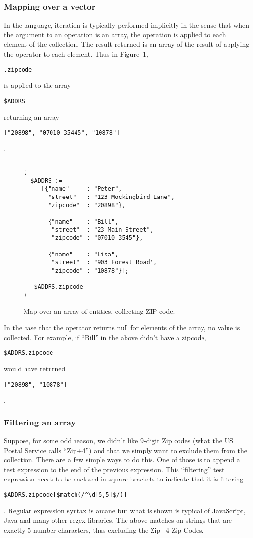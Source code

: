 \documentclass[9pt,letterpaper]{article}
\newcommand{\stt}[1]{\begin{footnotesize}\texttt{#1}\end{footnotesize}}
\begin{document}
\subsubsection{Mapping over a vector}
In the language, iteration is typically performed implicitly in the sense that when the argument to an operation is an array, the operation is applied to each element of the collection.
The result returned is an array of the result of applying the operator to each element.
Thus in Figure~\ref{code:simple-map}, \stt{.zipcode} is applied to the array \stt{\$ADDRS} returning  an array \stt{["20898", "07010-35445", "10878"]}.

\lstset{
    basicstyle=\footnotesize\ttfamily
  }

\begin{figure}[H]
    \caption{Map over an array of entities, collecting ZIP code.}
    \label{code:simple-map}
\begin{lstlisting}[basicstyle=\ttfamily\scriptsize]

(
  $ADDRS :=
     [{"name"     : "Peter",
       "street"   : "123 Mockingbird Lane",
       "zipcode"  : "20898"},

       {"name"    : "Bill",
        "street"  : "23 Main Street",
        "zipcode" : "07010-3545"},

       {"name"    : "Lisa",
        "street"  : "903 Forest Road",
        "zipcode" : "10878"}];

   $ADDRS.zipcode
)

\end{lstlisting}
\end{figure}

  In the case that the operator returns null for elements of the array, no value is collected.
  For example, if ``Bill'' in the above didn't have a zipcode, \stt{\$ADDRS.zipcode} would have returned \stt{["20898", "10878"]}.

\subsubsection{Filtering  an array}
Suppose, for some odd reason, we didn't like 9-digit Zip codes (what the US Postal Service calls ``Zip+4'') and that we simply want to exclude them from the collection.
There are a few simple ways to do this.
One of those is to append a test expression to the end of the previous expression. This ``filtering'' test expression needs to be enclosed in square brackets to indicate that it is filtering.
\stt{\$ADDRS.zipcode[\$match(/\^{}\textbackslash d[5,5]\$/)]}. Regular expression syntax is arcane but what is shown is typical of JavaScript, Java and many other regex libraries.
The above matches on strings that are exactly 5 number characters, thus excluding the Zip+4 Zip Codes.
\end{document}
